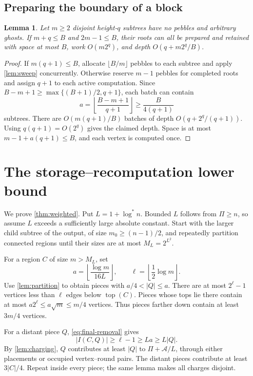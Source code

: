 \documentclass[11pt]{article}
\newtheorem{lemma}[lemma]{Lemma}
\theoremstyle{definition}
\theoremstyle{remark}
\DeclareMathOperator{\topv}{top}
\newcommand{\Area}{\mathcal A}
\begin{document}
\subsection{Preparing the boundary of a block}

\begin{lemma}
\label{lem:frontier}
Let $m\ge2$ disjoint height-$q$ subtrees have no pebbles and arbitrary ghosts. If $m+q\le B$ and $2m-1\le B$, their roots can all be prepared and retained with space at most $B$, work $O(m2^q)$, and depth $O(q+m2^q/B)$.
\end{lemma}
\begin{proof}
If $m(q+1)\le B$, allocate $\lfloor B/m\rfloor$ pebbles to each subtree and apply \cref{lem:sweep} concurrently. Otherwise reserve $m-1$ pebbles for completed roots and assign $q+1$ to each active computation. Since $B-m+1\ge\max\{(B+1)/2,q+1\}$, each batch can contain
\[
a=\left\lfloor\frac{B-m+1}{q+1}\right\rfloor\ge\frac{B}{4(q+1)}
\]
subtrees. There are $O(m(q+1)/B)$ batches of depth $O(q+2^q/(q+1))$. Using $q(q+1)=O(2^q)$ gives the claimed depth. Space is at most $m-1+a(q+1)\le B$, and each vertex is computed once.
\end{proof}

\section{The storage--recomputation lower bound}
\label{app:storage}

We prove \cref{thm:weighted}. Put $L=1+\log^*n$. Bounded $L$ follows from $\Pi\ge n$, so assume $L$ exceeds a sufficiently large absolute constant. Start with the larger child subtree of the output, of size $m_0\ge(n-1)/2$, and repeatedly partition connected regions until their sizes are at most $M_L=2^{L^2}$.

For a region $C$ of size $m>M_L$, set
\[
a=\left\lfloor\frac{\log m}{16L}\right\rfloor, \qquad \ell=\left\lfloor\frac12\log m\right\rfloor.
\]
Use \cref{lem:partition} to obtain pieces with $a/4<|Q|\le a$. There are at most $2^\ell-1$ vertices less than $\ell$ edges below $\topv(C)$. Pieces whose tops lie there contain at most $a2^\ell\le a\sqrt m\le m/4$ vertices. Thus pieces farther down contain at least $3m/4$ vertices.

For a distant piece $Q$, \cref{eq:final-removal} gives
\[
 |I(C,Q)|\ge\ell-1\ge La\ge L|Q|.
\]
By \cref{lem:charging}, $Q$ contributes at least $|Q|$ to $\Pi+\Area/L$, through either placements or occupied vertex--round pairs. The distant pieces contribute at least $3|C|/4$. Repeat inside every piece; the same lemma makes all charges disjoint.
\end{document}
